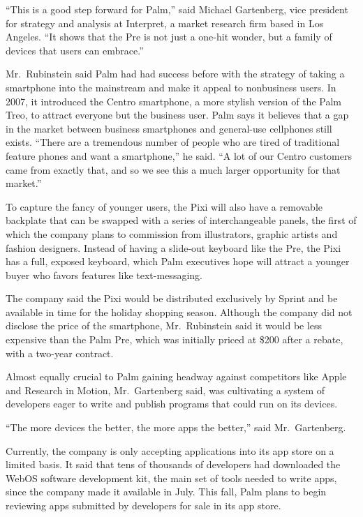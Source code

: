 ﻿\documentclass[12pt]{article}
\begin{document}
``This is a good step forward for Palm,'' said Michael Gartenberg, vice president for strategy and
analysis at Interpret, a market research firm based in Los Angeles. ``It shows that the Pre is not
just a one-hit wonder, but a family of devices that users can embrace.''

Mr.~Rubinstein said Palm had had success before with the strategy of taking a smartphone into the
mainstream and make it appeal to nonbusiness users. In 2007, it introduced the Centro smartphone, a
more stylish version of the Palm Treo, to attract everyone but the business user. Palm says it
believes that a gap in the market between business smartphones and general-use cellphones still
exists. ``There are a tremendous number of people who are tired of traditional feature phones and
want a smartphone,'' he said. ``A lot of our Centro customers came from exactly that, and so we see
this a much larger opportunity for that market.''

To capture the fancy of younger users, the Pixi will also have a removable backplate that can be
swapped with a series of interchangeable panels, the first of which the company plans to commission
from illustrators, graphic artists and fashion designers. Instead of having a slide-out keyboard
like the Pre, the Pixi has a full, exposed keyboard, which Palm executives hope will attract a
younger buyer who favors features like text-messaging.

The company said the Pixi would be distributed exclusively by Sprint and be available in time for
the holiday shopping season. Although the company did not disclose the price of the smartphone,
Mr.~Rubinstein said it would be less expensive than the Palm Pre, which was initially priced at
\$200 after a rebate, with a two-year contract.

Almost equally crucial to Palm gaining headway against competitors like Apple and Research in
Motion, Mr.~Gartenberg said, was cultivating a system of developers eager to write and publish
programs that could run on its devices.

``The more devices the better, the more apps the better,'' said Mr.~Gartenberg.

Currently, the company is only accepting applications into its app store on a limited basis. It said
that tens of thousands of developers had downloaded the WebOS software development kit, the main set
of tools needed to write apps, since the company made it available in July. This fall, Palm plans to
begin reviewing apps submitted by developers for sale in its app store.
\end{document}
